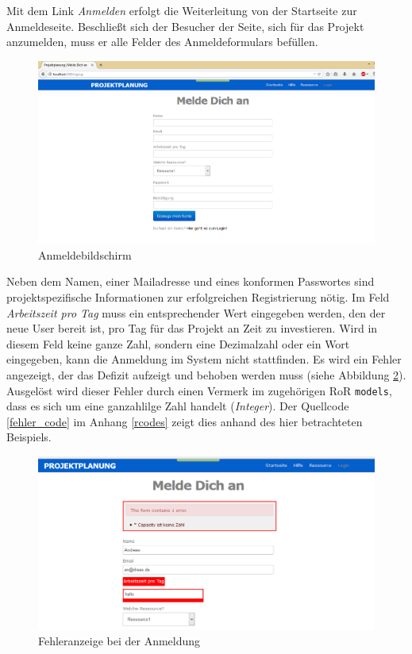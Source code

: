 \documentclass[a4paper,12pt,parskip,bibtotoc,liststotoc]{article}
\begin{document}
Mit dem Link \textit{Anmelden} erfolgt die Weiterleitung von der Startseite zur Anmeldeseite. Beschließt sich der Besucher der Seite, sich für das Projekt anzumelden, muss er alle Felder des Anmeldeformulars befüllen.

\begin{figure}[h!]
  \begin{center}
    \includegraphics[width=120mm]{Bilder/Anmeldung.png}
    \caption{Anmeldebildschirm}  \label{Anm}
  \end{center}
\end{figure}

Neben dem Namen, einer Mailadresse und eines konformen Passwortes sind projektspezifische Informationen zur erfolgreichen Registrierung nötig. Im Feld \textit{Arbeitszeit pro Tag} muss ein entsprechender Wert eingegeben werden, den der neue User bereit ist, pro Tag für das Projekt an Zeit zu investieren. Wird in diesem Feld keine ganze Zahl, sondern eine Dezimalzahl oder ein Wort eingegeben, kann die Anmeldung im System nicht stattfinden. Es wird ein Fehler angezeigt, der das Defizit aufzeigt und behoben werden muss (siehe Abbildung \ref{Fehler}). Ausgelöst wird dieser Fehler durch einen Vermerk im zugehörigen RoR \texttt{models}, dass es sich um eine ganzahlilge Zahl handelt (\textit{Integer}). Der Quellcode \ref{fehler_code} im Anhang \ref{rcodes} zeigt dies anhand des hier betrachteten Beispiels.\\

\begin{figure}[h!]
  \begin{center}
    \includegraphics[width=120mm]{Bilder/Anmeldung_Fehleranzeige.png}
    \caption{Fehleranzeige bei der Anmeldung}  \label{Fehler}
  \end{center}
\end{figure}
\end{document}
